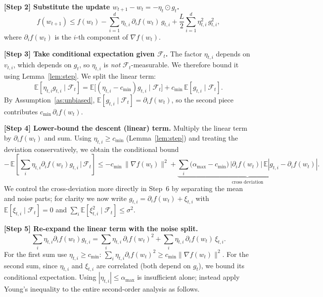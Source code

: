 \documentclass[11pt]{article}
\begin{document}
\noindent\textbf{[Step 2] Substitute the update $w_{t+1}-w_t=-\eta_t\odot g_t$.}
\[
f(w_{t+1}) \le f(w_t)
- \sum_{i=1}^d \eta_{t,i}\, \partial_i f(w_t)\, g_{t,i}
+ \frac{L}{2}\sum_{i=1}^d \eta_{t,i}^2\, g_{t,i}^2 ,
\]
where $\partial_i f(w_t)$ is the $i$-th component of $\nabla f(w_t)$.

\noindent\textbf{[Step 3] Take conditional expectation given $\mathcal{F}_t$.}
The factor $\eta_{t,i}$ depends on $v_{t,i}$, which depends on $g_t$, so
$\eta_{t,i}$ is \emph{not} $\mathcal{F}_t$-measurable. We therefore bound it
using Lemma~\ref{lem:step}. We split the linear term:
\[
\mathbb{E}[\eta_{t,i} g_{t,i}\mid\mathcal F_t]
= \mathbb{E}\big[(\eta_{t,i}-c_{\min})g_{t,i}\mid\mathcal F_t\big]
+ c_{\min}\,\mathbb{E}[g_{t,i}\mid\mathcal F_t].
\]
By Assumption~\ref{as:unbiased}, $\mathbb{E}[g_{t,i}\mid\mathcal F_t]
=\partial_i f(w_t)$, so the second piece contributes
$c_{\min}\,\partial_i f(w_t)$.

\noindent\textbf{[Step 4] Lower-bound the descent (linear) term.}
Multiply the linear term by $\partial_i f(w_t)$ and sum. Using
$\eta_{t,i}\ge c_{\min}$ (Lemma~\ref{lem:step}) and treating the
deviation conservatively, we obtain the conditional bound
\[
-\,\mathbb{E}\!\left[\sum_i \eta_{t,i}\partial_i f(w_t) g_{t,i}\,\Big|\,\mathcal F_t\right]
\le
- c_{\min}\,\|\nabla f(w_t)\|^2
+ \underbrace{\sum_i \big(\alpha_{\max}-c_{\min}\big)\,|\partial_i f(w_t)|\,
\mathbb{E}|g_{t,i}-\partial_i f(w_t)|}_{\text{cross deviation}} .
\]
We control the cross-deviation more directly in Step~6 by separating the
mean and noise parts; for clarity we now write
$g_{t,i}=\partial_i f(w_t)+\xi_{t,i}$ with
$\mathbb{E}[\xi_{t,i}\mid\mathcal F_t]=0$ and
$\sum_i\mathbb{E}[\xi_{t,i}^2\mid\mathcal F_t]\le\sigma^2$.

\noindent\textbf{[Step 5] Re-expand the linear term with the noise split.}
\[
\sum_i \eta_{t,i}\partial_i f(w_t) g_{t,i}
= \sum_i \eta_{t,i}\,\partial_i f(w_t)^2
+ \sum_i \eta_{t,i}\,\partial_i f(w_t)\,\xi_{t,i}.
\]
For the first sum use $\eta_{t,i}\ge c_{\min}$:
$\sum_i \eta_{t,i}\partial_i f(w_t)^2 \ge c_{\min}\|\nabla f(w_t)\|^2$.
For the second sum, since $\eta_{t,i}$ and $\xi_{t,i}$ are correlated
(both depend on $g_t$), we bound its conditional expectation. Using
$|\eta_{t,i}|\le\alpha_{\max}$ is insufficient alone; instead apply
Young's inequality to the entire second-order analysis as follows.
\end{document}
